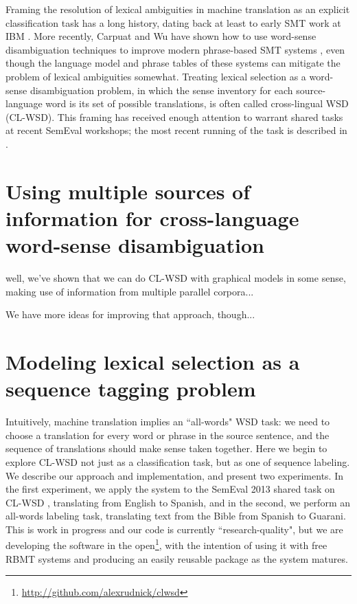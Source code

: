 \documentclass{article}
\begin{document}
Framing the resolution of lexical ambiguities in machine translation
as an explicit classification
task has a long history, dating back at least to early SMT work at IBM
\cite{Brown91word-sensedisambiguation}.  More recently, Carpuat and Wu have
shown how to use word-sense disambiguation techniques to improve modern
phrase-based SMT systems \cite{carpuatpsd}, even though the language model and
phrase tables of these systems can mitigate the problem of lexical ambiguities
somewhat. Treating lexical selection as a word-sense disambiguation problem, in
which the sense inventory for each source-language word is its set of possible
translations, is often called cross-lingual WSD (CL-WSD). This framing has
received enough attention to warrant shared tasks at recent SemEval workshops;
the most recent running of the task is described in \cite{task10}.









\section{Using multiple sources of information for cross-language word-sense
disambiguation}
well, we've shown that we can do CL-WSD with graphical models in some sense,
making use of information from multiple parallel corpora...

We have more ideas for improving that approach, though...

\cite{rudnick-liu-gasser:2013:SemEval-2013}


\section{Modeling lexical selection as a sequence tagging problem}

\cite{rudnick-gasser:2013:HyTra-2013}

Intuitively, machine translation implies an ``all-words" WSD task: we need to
choose a translation for every word or phrase in the source sentence, and the
sequence of translations should make sense taken together. Here we begin to
explore CL-WSD not just as a classification task, but as one of sequence
labeling. We describe our approach and implementation, and present two
experiments. In the first experiment, we apply the system to the SemEval 2013
shared task on CL-WSD \cite{task10}, translating from English to Spanish, and
in the second, we perform an all-words labeling task, translating text from the
Bible from Spanish to Guarani. This is work in progress and our code is
currently ``research-quality", but we are developing the software in the
open\footnote{\url{http://github.com/alexrudnick/clwsd}}, with the intention of
using it with free RBMT systems and producing an easily reusable package as the
system matures.
\end{document}
